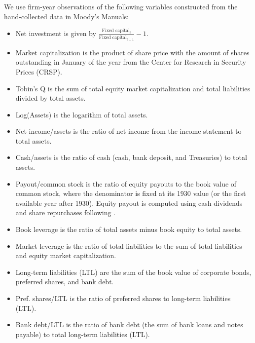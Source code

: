 We use firm-year observations of the following variables constructed from the hand-collected data in Moody's Manuals:
	\begin{itemize}
		\item Net investment is given by $\frac{\text{Fixed capital}_t}{\text{Fixed capital}_{t-1}} - 1$.

        \item Market capitalization is the product of share price with the amount of shares outstanding in January of the year from the Center for Research in Security Prices (CRSP).
        
		\item Tobin's Q is the sum of total equity market capitalization and total liabilities divided by total assets.

        \item Log(Assets) is the logarithm of total assets.

        \item Net income/assets is the ratio of net income from the income statement to total assets. 

        \item Cash/assets is the ratio of cash (cash, bank deposit, and Treasuries) to total assets. 

		\item Payout/common stock is the ratio of equity payouts to the book value of common stock, where the denominator is fixed at its 1930 value (or the first available year after 1930). Equity payout is computed using cash dividends and share repurchases following \cite{Boudoukh2007}. 
        
		\item Book leverage is the ratio of total assets minus book equity to total assets.

        \item Market leverage is the ratio of total liabilities to the sum of total liabilities and equity market capitalization. 
        
        \item Long-term liabilities (LTL) are the sum of the book value of corporate bonds, preferred shares, and bank debt. 
		
		\item Pref. shares/LTL is the ratio of preferred shares to long-term liabilities (LTL).
		
		\item Bank debt/LTL is the ratio of bank debt (the sum of bank loans and notes payable) to total long-term liabilities (LTL).		
		

\end{itemize}
